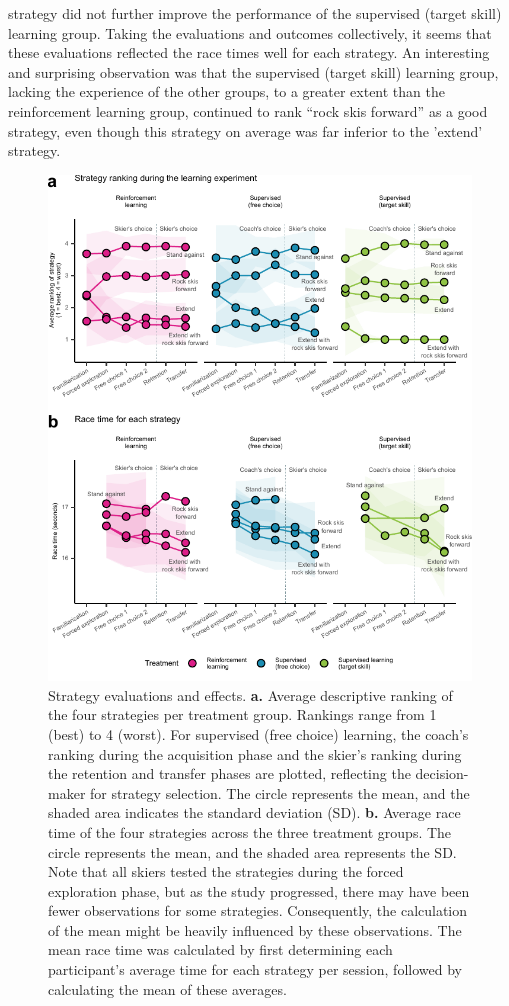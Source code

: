 \documentclass[pdflatex,sn-mathphys-num]{sn-jnl}%
\theoremstyle{thmstyleone}%
\theoremstyle{thmstyletwo}%
\theoremstyle{thmstylethree}%
\begin{document}
strategy did not further improve the performance of the supervised (target skill) learning group. Taking the evaluations and outcomes collectively, it seems that these evaluations reflected the race times well for each strategy. An interesting and surprising observation was that the supervised (target skill) learning group, lacking the experience of the other groups, to a greater extent than the reinforcement learning group, continued to rank “rock skis forward” as a good strategy, even though this strategy on average was far inferior to the 'extend' strategy.


\begin{figure}[H]
\centering
\includegraphics[]{figures/figure_ranking_average_3.pdf}
\caption{Strategy evaluations and effects. \textbf{a. }Average descriptive ranking of the four strategies per treatment group. Rankings range from 1 (best) to 4 (worst). For supervised (free choice) learning, the coach's ranking during the acquisition phase and the skier's ranking during the retention and transfer phases are plotted, reflecting the decision- maker for strategy selection. The circle represents the mean, and the shaded area indicates the standard deviation (SD). \textbf{b.} Average race time of the four strategies across the three treatment groups. The circle represents the mean, and the shaded area represents the SD. Note that all skiers tested the strategies during the forced exploration phase, but as the study progressed, there may have been fewer observations for some strategies. Consequently, the calculation of the mean might be heavily influenced by these observations. The mean race time was calculated by first determining each participant's average time for each strategy per session, followed by calculating the mean of these averages.}\label{fig: rank}
\end{figure}
\end{document}
